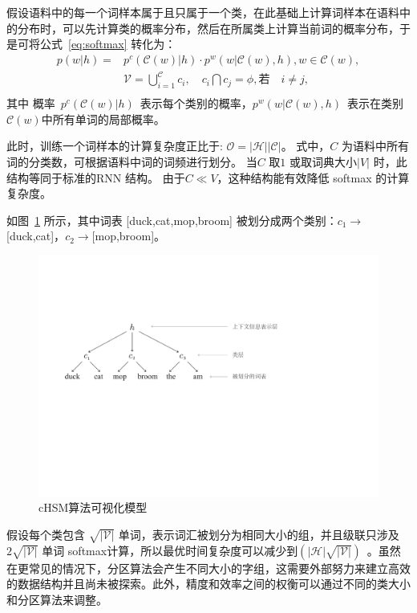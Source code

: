 假设语料中的每一个词样本属于且只属于一个类，在此基础上计算词样本在语料中的分布时，可以先计算类的概率分布，然后在所属类上计算当前词的概率分布，于是可将公式~\ref{eq:softmax} 转化为：
  \begin{equation}
  \begin{split}
p(w|h)=&p^c(\mathcal{C}(w)|h)\cdot p^w(w|\mathcal{C}(w),h) , w\in \mathcal{C}(w),\\
&\mathcal{V}=\bigcup _{i = 1}^\mathcal{C}{c_i},\quad  c_i \bigcap c_j=\phi, \text{若}\quad i\ne j, \\
\end{split}
\end{equation}
其中 概率~$p^c(\mathcal{C}(w)|h)$~表示每个类别的概率，$p^w(w|\mathcal{C}(w),h)$~表示在类别$\mathcal{C}(w)$中所有单词的局部概率。

此时，训练一个词样本的计算复杂度正比于: $\mathcal{O =|H||C|}$。 式中，$C$ 为语料中所有词的分类数，可根据语料中词的词频进行划分。 当$C$ 取$1$ 或取词典大小$|V|$ 时，此结构等同于标准的RNN 结构。 由于$C \ll V$，这种结构能有效降低 softmax 的计算复杂度。

如图~\ref{fig:case_hsm} 所示，其中词表 [duck,cat,mop,broom] 被划分成两个类别：$c_1\to$[duck,cat]，$c_2\to$[mop,broom]。
\begin{figure}[!h]
  \centering
\includegraphics[width=0.79\linewidth]{./figures/case_chsm.pdf}
\caption{cHSM算法可视化模型}\label{fig:case_hsm}
\end{figure}


假设每个类包含 $\sqrt{\mathcal{|V|}}$ 单词，表示词汇被划分为相同大小的组，并且级联只涉及$2\sqrt{\mathcal{|V|}}$ 单词 softmax计算，所以最优时间复杂度可以减少到$(\mathcal{|H|}\sqrt{\mathcal{|V|}})$~。虽然在更常见的情况下，分区算法会产生不同大小的字组，这需要外部努力来建立高效的数据结构并且尚未被探索。此外，精度和效率之间的权衡可以通过不同的类大小和分区算法来调整。

